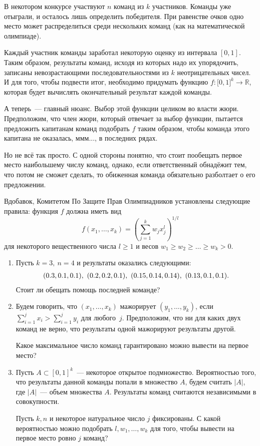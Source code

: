 
В некотором конкурсе участвуют $n$ команд из $k$ участников. Команды уже отыграли, и осталось лишь определить победителя. При равенстве очков одно место может распределиться среди нескольких команд (как на математической олимпиаде).

Каждый участник команды заработал некоторую оценку из интервала $[0,1]$. Таким образом, результаты команд, исходя из которых надо их упорядочить, записаны невозрастающими последовательностями из $k$ неотрицательных чисел. И для того, чтобы подвести итог, необходимо придумать функцию $f: \mathbb [0,1]^k\to \mathbb R$, которая будет вычислять окончательный результат каждой команды.

А теперь~— главный нюанс. Выбор этой функции целиком во власти жюри. Предположим, что член жюри, который отвечает за выбор функции, пытается предложить капитанам команд подобрать $f$ таким образом, чтобы команда этого капитана не оказалась, ммм..., в последних рядах. 

Но не всё так просто. С одной стороны понятно, что стоит пообещать первое место наибольшему числу команд, однако, если ответственный обнадёжит тем, что потом не сможет сделать, то обиженная команда обязательно разболтает о его предложении.

Вдобавок, Комитетом По Защите Прав Олимпиадников установлены следующие правила: функция $f$ должна иметь вид
$$
f(x_1,\dots,x_k) =\left (\sum\limits_{j = 1}^kw_jx_j^l  \right )^{1/l}
$$
для некоторого вещественного числа $l\geq 1$ и весов $w_1\geq w_2\geq\dots\geq w_k> 0$.


\bigskip
\begin{enumerate}
\item Пусть $k = 3,\ n = 4$ и результаты оказались следующими:
$$\bar{l}
(0.3,0.1,0.1),\ (0.2,0.2,0.1),\ (0.15, 0.14, 0.14),\ (0.13,0.1,0.1).
\ear$$
Стоит ли обещать помощь последней команде?

\item
 Будем говорить, что $(x_1,\dots, x_k)$ мажорирует $(y_1,\dots,y_k)$, если $\sum\limits_{i = 1}^jx_i > \sum\limits_{i = 1}^jy_i$ для любого~$j$. Предположим, что ни для каких двух команд не верно, что результаты одной мажорируют результаты другой.

Какое максимальное число команд гарантировано можно вывести на первое место?

\item Пусть $A\subset [0,1]^k$~— некоторое открытое подмножество. Вероятностью того, что результаты данной команды попали в множество $A$, будем считать $|A|$, где $|A|$~— объем множества $A$. Результаты команд считаются независимыми в совокупности.

Пусть $k,n$ и некоторое натуральное число $j$ фиксированы. С какой вероятностью можно подобрать $l,w_1,\dots, w_k$ для того, чтобы вывести на первое место ровно $j$ команд?

\end{enumerate}





